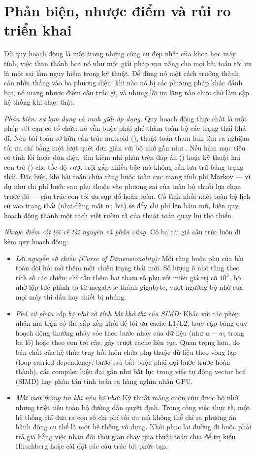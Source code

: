 \documentclass[../../algorithm.tex]{subfiles}
\begin{document}
\section{Phản biện, nhược điểm và rủi ro triển khai}

Dù quy hoạch động là một trong những công cụ đẹp nhất của khoa học máy tính, việc thần thánh hoá nó như một giải pháp vạn năng cho mọi bài toán tối ưu là một sai lầm nguy hiểm trong kỹ thuật. Để dùng nó một cách trưởng thành, cần nhìn thẳng vào ba phương diện: khi nào nó bị các phương pháp khác đánh bại, nó mang nhược điểm cấu trúc gì, và những lỗi im lặng nào chực chờ làm sập hệ thống khi chạy thật.

\emph{Phản biện: sự lạm dụng và ranh giới áp dụng.} Quy hoạch động thực chất là một phép vét cạn có tổ chức: nó vẫn buộc phải ghé thăm toàn bộ các trạng thái khả dĩ. Nếu bài toán sở hữu cấu trúc matroid (), thuật toán tham lam tìm ra nghiệm tối ưu chỉ bằng một lượt quét đơn giản với bộ nhớ gần như . Nếu hàm mục tiêu có tính lồi hoặc đơn điệu, tìm kiếm nhị phân trên đáp án () hoặc kỹ thuật hai con trỏ () cho tốc độ vượt trội gấp nhiều bậc mà không cần lưu trữ bảng trạng thái. Đặc biệt, khi bài toán chứa ràng buộc toàn cục mang tính phi Markov --- ví dụ như chi phí bước sau phụ thuộc vào phương sai của toàn bộ chuỗi lựa chọn trước đó --- cấu trúc con tối ưu sụp đổ hoàn toàn. Cố tình nhồi nhét toàn bộ lịch sử vào trạng thái (như dùng mặt nạ bit) sẽ đẩy chi phí lên hàm mũ, biến quy hoạch động thành một cách viết rườm rà của thuật toán quay lui thô thiển.

\emph{Nhược điểm cốt lõi về tài nguyên và phần cứng.} Có ba cái giá cấu trúc luôn đi kèm quy hoạch động:
\begin{itemize}
\item \emph{Lời nguyền số chiều (Curse of Dimensionality):} Mỗi ràng buộc phụ của bài toán đòi hỏi mở thêm một chiều trạng thái mới. Số lượng ô nhớ tăng theo tích số các chiều; chỉ cần thêm hai tham số phụ với miền giá trị cỡ \(10^3\), bộ nhớ lập tức phình to từ megabyte thành gigabyte, vượt ngưỡng bộ nhớ của mọi máy thi đấu hay thiết bị nhúng.
\item \emph{Phá vỡ phân cấp bộ nhớ và tính bất khả thi của SIMD:} Khác với các phép nhân ma trận có thể sắp xếp khối để tối ưu cache L1/L2, truy cập bảng quy hoạch động thường nhảy cóc theo bước nhảy của dữ liệu (như \(w - w_i\) trong ba lô) hoặc theo con trỏ cây, gây trượt cache liên tục. Quan trọng hơn, do bản chất của hệ thức truy hồi luôn chứa phụ thuộc dữ liệu theo vòng lặp (loop-carried dependency: bước sau bắt buộc phải đợi bước trước hoàn thành), các compiler hiện đại gần như bất lực trong việc tự động vector hoá (SIMD) hay phân tán tính toán ra hàng nghìn nhân GPU.
\item \emph{Mất mát thông tin khi nén bộ nhớ:} Kỹ thuật mảng cuộn cứu được bộ nhớ nhưng triệt tiêu toàn bộ đường dẫn quyết định. Trong công việc thực tế, một hệ thống chỉ đưa ra con số chi phí tối ưu mà không thể chỉ ra phương án hành động cụ thể là một hệ thống vô dụng. Khôi phục lại đường đi buộc phải trả giá bằng việc nhân đôi thời gian chạy qua thuật toán chia để trị kiểu Hirschberg hoặc cài đặt các cấu trúc bit phức tạp.
\end{itemize}
\end{document}
